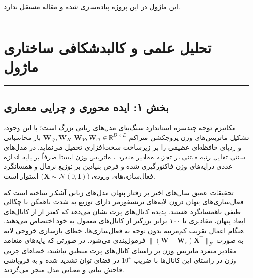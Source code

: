 \clearpage
{}
\vspace*{0.2cm}

این ماژول در این پروژه پیاده‌سازی شده و مقاله مستقل ندارد.
\noindent\rule{\textwidth}{1.2pt}
\vspace*{0.1cm}
\section{تحلیل علمی و کالبدشکافی ساختاری ماژول }
\label{sec:mod_asvd_attention}
\vspace*{-0.2cm}
\noindent\rule{\textwidth}{0.5pt}
\vspace*{0.3cm}

\subsection*{بخش ۱: ایده محوری و چرایی معماری }
مکانیزم توجه چندسره استاندارد  سنگ‌بنای مدل‌های زبانی بزرگ است؛ با این وجود، تشکیل ماتریس‌های وزن پروجکشن متراکم $\mathbf{W}_Q, \mathbf{W}_K, \mathbf{W}_V, \mathbf{W}_O \in \mathbb{R}^{D \times D}$ بار محاسباتی و ردپای حافظه‌ای عظیمی را بر زیرساخت سخت‌افزاری تحمیل می‌نماید. در مدل‌های سنتی تقلیل رتبه مبتنی بر تجزیه مقادیر منفرد ، ماتریس وزن ایستا صرفاً بر پایه اندازه عددی درایه‌های وزن فاکتورگیری شده و فرض بنیادین بر توزیع نرمال و همسانگرد  فعال‌سازی‌های ورودی ($\mathbf{X} \sim \mathcal{N}(0, \mathbf{I})$) استوار است.

تحقیقات عمیق سال‌های اخیر بر رفتار پنهان مدل‌های زبانی آشکار ساخته است که فعال‌سازی‌های پنهان درون لایه‌های ترنسفورمر دارای توزیع به شدت ناهمگن با چگالی طیفی ناهمسانگرد هستند. پدیده کانال‌های پرت  نشان می‌دهد که کمتر از  از کانال‌های ابعاد پنهان، مقادیری تا ۱۰۰ برابر بزرگتر از کانال‌های معمول به خود اختصاص می‌دهند. هنگام اعمال تقریب کم‌مرتبه بدون توجه به فعال‌سازی‌ها، خطای بازسازی خروجی لایه به صورت $\|(\mathbf{W} - \mathbf{W}_r)\mathbf{X}^\top\|_F$ فرمول‌بندی می‌شود. در صورتی که پایه‌های متعامد مقادیر منفرد ماتریس وزن بر راستای کانال‌های پرت منطبق نباشند، خطاهای جزیی وزن در راستای این کانال‌ها با ضریب $10^4$ در فضای توان تشدید شده و به فروپاشی فاحش بیانی و معنایی مدل منجر می‌گردند.


